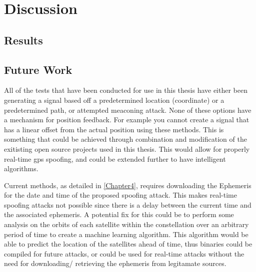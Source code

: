 
\chapter{Discussion} %

\label{Chapter6} %


\section{Results}

\section{Future Work}
All of the tests that have been conducted for use in this thesis have either been generating a signal based off a predetermined location (coordinate) or a predetermined
path, or attempted meaconing attack. None of these options have a mechanism for position feedback. For example you cannot create a signal that has a linear offset from
the actual position using these methods. This is something that could be achieved through combination and modification of the exitisting open source projects used in this
thesis. This would allow for properly real-time gps spoofing, and could be extended further to have intelligent algorithms.

Current methods, as detailed in \ref{Chapter4}, requires downloading the Ephemeris for the date and time of the proposed spoofing attack. This makes real-time spoofing
attacks not possible since there is a delay between the current time and the associated ephemeris. A potential fix for this could be to perform some analysis on the
orbits of each satellite within the constellation over an arbitrary period of time to create a machine learning algorithm. This algorithm would be able to predict the
location of the satellites ahead of time, thus binaries could be compiled for future attacks, or could be used for real-time attacks without the need for downloading/
retrieving the ephemeris from legitamate sources.